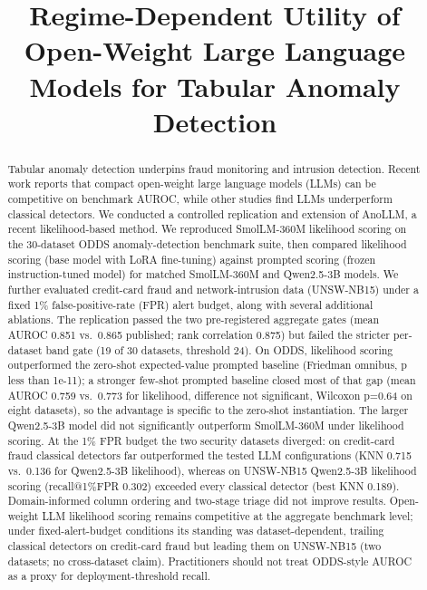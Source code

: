 \documentclass[conference]{IEEEtran}
\begin{document}
\title{Regime-Dependent Utility of Open-Weight Large Language Models for Tabular Anomaly Detection}

\author{
\and
{}
}

\maketitle

\begin{abstract}
Tabular anomaly detection underpins fraud monitoring and intrusion detection.
Recent work reports that compact open-weight large language models (LLMs) can be competitive on benchmark AUROC, while other studies find LLMs underperform classical detectors.
We conducted a controlled replication and extension of AnoLLM, a recent likelihood-based method.
We reproduced SmolLM-360M likelihood scoring on the 30-dataset ODDS anomaly-detection benchmark suite, then compared likelihood scoring (base model with LoRA fine-tuning) against prompted scoring (frozen instruction-tuned model) for matched SmolLM-360M and Qwen2.5-3B models.
We further evaluated credit-card fraud and network-intrusion data (UNSW-NB15) under a fixed 1\% false-positive-rate (FPR) alert budget, along with several additional ablations.
The replication passed the two pre-registered aggregate gates (mean AUROC 0.851 vs.\ 0.865 published; rank correlation 0.875) but failed the stricter per-dataset band gate (19 of 30 datasets, threshold 24).
On ODDS, likelihood scoring outperformed the zero-shot expected-value prompted baseline (Friedman omnibus, p less than 1e-11); a stronger few-shot prompted baseline closed most of that gap (mean AUROC 0.759 vs.\ 0.773 for likelihood, difference not significant, Wilcoxon p=0.64 on eight datasets), so the advantage is specific to the zero-shot instantiation. The larger Qwen2.5-3B model did not significantly outperform SmolLM-360M under likelihood scoring.
At the 1\% FPR budget the two security datasets diverged: on credit-card fraud classical detectors far outperformed the tested LLM configurations (KNN 0.715 vs.\ 0.136 for Qwen2.5-3B likelihood), whereas on UNSW-NB15 Qwen2.5-3B likelihood scoring (recall@1\%FPR 0.302) exceeded every classical detector (best KNN 0.189).
Domain-informed column ordering and two-stage triage did not improve results.
Open-weight LLM likelihood scoring remains competitive at the aggregate benchmark level; under fixed-alert-budget conditions its standing was dataset-dependent, trailing classical detectors on credit-card fraud but leading them on UNSW-NB15 (two datasets; no cross-dataset claim).
Practitioners should not treat ODDS-style AUROC as a proxy for deployment-threshold recall.
\end{abstract}
\end{document}
